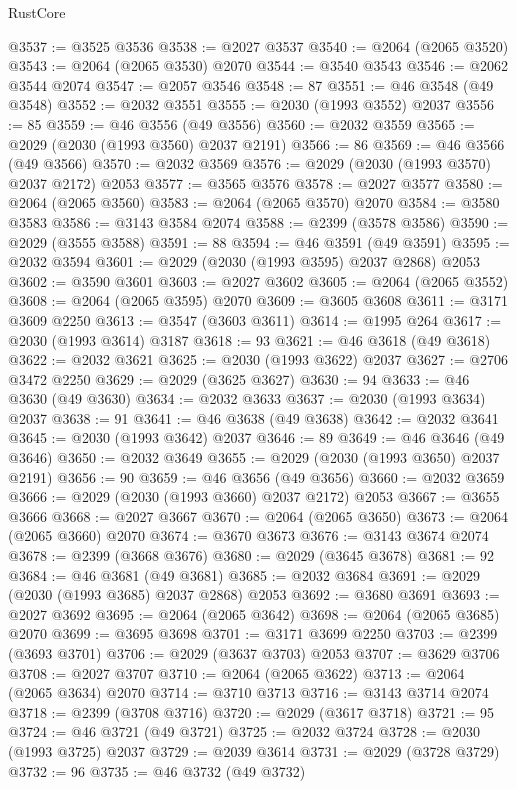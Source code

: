 \begin{lexlean}{RustCore}
\begin{coremodule}
@3537 := @3525 @3536
@3538 := @2027 @3537
@3540 := @2064 (@2065 @3520)
@3543 := @2064 (@2065 @3530) @2070
@3544 := @3540 @3543
@3546 := @2062 @3544 @2074
@3547 := @2057 @3546
@3548 := 87
@3551 := @46 @3548 (@49 @3548)
@3552 := @2032 @3551
@3555 := @2030 (@1993 @3552) @2037
@3556 := 85
@3559 := @46 @3556 (@49 @3556)
@3560 := @2032 @3559
@3565 := @2029 (@2030 (@1993 @3560) @2037 @2191)
@3566 := 86
@3569 := @46 @3566 (@49 @3566)
@3570 := @2032 @3569
@3576 := @2029 (@2030 (@1993 @3570) @2037 @2172) @2053
@3577 := @3565 @3576
@3578 := @2027 @3577
@3580 := @2064 (@2065 @3560)
@3583 := @2064 (@2065 @3570) @2070
@3584 := @3580 @3583
@3586 := @3143 @3584 @2074
@3588 := @2399 (@3578 @3586)
@3590 := @2029 (@3555 @3588)
@3591 := 88
@3594 := @46 @3591 (@49 @3591)
@3595 := @2032 @3594
@3601 := @2029 (@2030 (@1993 @3595) @2037 @2868) @2053
@3602 := @3590 @3601
@3603 := @2027 @3602
@3605 := @2064 (@2065 @3552)
@3608 := @2064 (@2065 @3595) @2070
@3609 := @3605 @3608
@3611 := @3171 @3609 @2250
@3613 := @3547 (@3603 @3611)
@3614 := @1995 @264
@3617 := @2030 (@1993 @3614) @3187
@3618 := 93
@3621 := @46 @3618 (@49 @3618)
@3622 := @2032 @3621
@3625 := @2030 (@1993 @3622) @2037
@3627 := @2706 @3472 @2250
@3629 := @2029 (@3625 @3627)
@3630 := 94
@3633 := @46 @3630 (@49 @3630)
@3634 := @2032 @3633
@3637 := @2030 (@1993 @3634) @2037
@3638 := 91
@3641 := @46 @3638 (@49 @3638)
@3642 := @2032 @3641
@3645 := @2030 (@1993 @3642) @2037
@3646 := 89
@3649 := @46 @3646 (@49 @3646)
@3650 := @2032 @3649
@3655 := @2029 (@2030 (@1993 @3650) @2037 @2191)
@3656 := 90
@3659 := @46 @3656 (@49 @3656)
@3660 := @2032 @3659
@3666 := @2029 (@2030 (@1993 @3660) @2037 @2172) @2053
@3667 := @3655 @3666
@3668 := @2027 @3667
@3670 := @2064 (@2065 @3650)
@3673 := @2064 (@2065 @3660) @2070
@3674 := @3670 @3673
@3676 := @3143 @3674 @2074
@3678 := @2399 (@3668 @3676)
@3680 := @2029 (@3645 @3678)
@3681 := 92
@3684 := @46 @3681 (@49 @3681)
@3685 := @2032 @3684
@3691 := @2029 (@2030 (@1993 @3685) @2037 @2868) @2053
@3692 := @3680 @3691
@3693 := @2027 @3692
@3695 := @2064 (@2065 @3642)
@3698 := @2064 (@2065 @3685) @2070
@3699 := @3695 @3698
@3701 := @3171 @3699 @2250
@3703 := @2399 (@3693 @3701)
@3706 := @2029 (@3637 @3703) @2053
@3707 := @3629 @3706
@3708 := @2027 @3707
@3710 := @2064 (@2065 @3622)
@3713 := @2064 (@2065 @3634) @2070
@3714 := @3710 @3713
@3716 := @3143 @3714 @2074
@3718 := @2399 (@3708 @3716)
@3720 := @2029 (@3617 @3718)
@3721 := 95
@3724 := @46 @3721 (@49 @3721)
@3725 := @2032 @3724
@3728 := @2030 (@1993 @3725) @2037
@3729 := @2039 @3614
@3731 := @2029 (@3728 @3729)
@3732 := 96
@3735 := @46 @3732 (@49 @3732)

\end{coremodule}
\end{lexlean}
